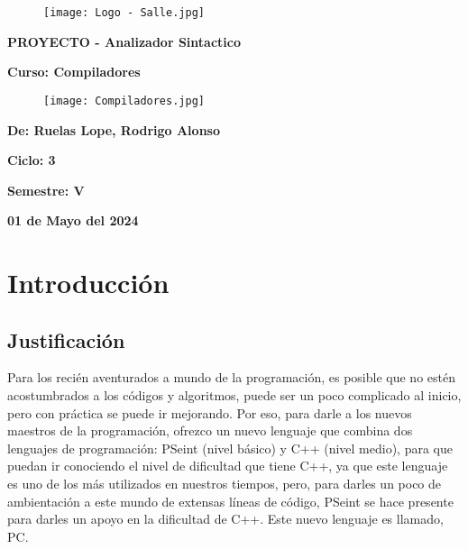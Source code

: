 \documentclass{article}
\begin{document}
\begin{titlepage}
    \centering
    \begin{figure}[htbp]
    \centering
    \texttt{[image: Logo - Salle.jpg]} 
    \label{fig:ejemplo}
    \end{figure}
    
    {\Huge\bfseries PROYECTO - Analizador Sintactico \par}
    \vspace{1.5cm}
    
    {\Large\bfseries Curso: Compiladores \par}
    \vspace{0.5cm}

    \begin{figure}[htbp]
    \centering
    \texttt{[image: Compiladores.jpg]}
    \label{fig:ejemplo}
    \end{figure}
    
    {\Large\bfseries De: Ruelas Lope, Rodrigo Alonso\par}
    {\Large\bfseries Ciclo: 3\par}
    {\Large\bfseries Semestre: V\par}
    {\Large\bfseries 01 de Mayo del 2024\par}
\end{titlepage}

\tableofcontents %

\newpage %

\section{Introducción}
\subsection{Justificación}
Para los recién aventurados a mundo de la programación, es posible que no estén acostumbrados a los códigos y algoritmos, puede ser un poco complicado al inicio, pero con práctica se puede ir mejorando. Por eso, para darle a los nuevos maestros de la programación, ofrezco un nuevo lenguaje que combina dos lenguajes de programación: PSeint (nivel básico) y C++ (nivel medio), para que puedan ir conociendo el nivel de dificultad que tiene C++, ya que este lenguaje es uno de los más utilizados en nuestros tiempos, pero, para darles un poco de ambientación a este mundo de extensas líneas de código, PSeint se hace presente para darles un apoyo en la dificultad de C++. Este nuevo lenguaje es llamado, PC.
\end{document}
